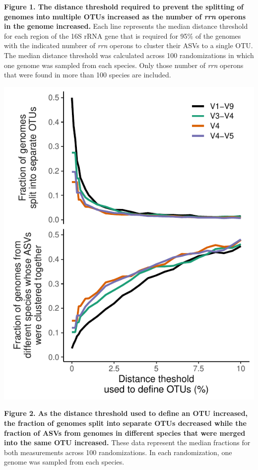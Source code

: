 \documentclass[
]{article}
\begin{document}
\textbf{Figure 1. The distance threshold required to prevent the
splitting of genomes into multiple OTUs increased as the number of
\emph{rrn} operons in the genome increased.} Each line represents the
median distance threshold for each region of the 16S rRNA gene that is
required for 95\% of the genomes with the indicated numbrer of
\emph{rrn} operons to cluster their ASVs to a single OTU. The median
distance threshold was calculated across 100 randomizations in which one
genome was sampled from each species. Only those number of \emph{rrn}
operons that were found in more than 100 species are included.

\newpage

\includegraphics{../figures/lump_split.pdf}

\textbf{Figure 2. As the distance threshold used to define an OTU
increased, the fraction of genomes split into separate OTUs decreased
while the fraction of ASVs from genomes in different species that were
merged into the same OTU increased.} These data represent the median
fractions for both measurements across 100 randomizations. In each
randomization, one genome was sampled from each species.
\end{document}
